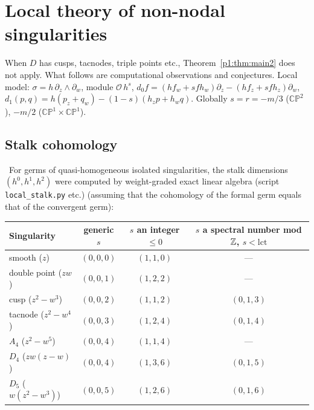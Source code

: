 \section{Local theory of non-nodal singularities}\label{p1:sec:local}
When $D$ has cusps, tacnodes, triple points etc., Theorem~\ref{p1:thm:main2} does not apply. What follows are computational observations and conjectures. Local model: $\sigma=h\,\partial_z\wedge\partial_w$, module $\mathcal O\,h^s$, $d_0f=(hf_w+sfh_w)\partial_z-(hf_z+sfh_z)\partial_w$, $d_1(p,q)=h(p_z+q_w)-(1-s)(h_zp+h_wq)$. Globally $s=r=-m/3$ ($\mathbb{CP}^2$), $-m/2$ ($\mathbb{CP}^1\times\mathbb{CP}^1$).

\subsection{Stalk cohomology}
\tV\ For germs of quasi-homogeneous isolated singularities, the stalk dimensions $(h^0,h^1,h^2)$ were computed by weight-graded exact linear algebra (script \texttt{local\_stalk.py} etc.) (assuming that the cohomology of the formal germ equals that of the convergent germ):
\begin{center}\small
\begin{tabular}{lccc}\toprule
Singularity & generic $s$ & $s$ an integer $\le0$ & $s$ a spectral number mod $\mathbb Z$, $s<\mathrm{lct}$\\\midrule
smooth ($z$) & $(0,0,0)$ & $(1,1,0)$ & ---\\
double point ($zw$) & $(0,0,1)$ & $(1,2,2)$ & ---\\
cusp ($z^2-w^3$) & $(0,0,2)$ & $(1,1,2)$ & $(0,1,3)$\\
tacnode ($z^2-w^4$) & $(0,0,3)$ & $(1,2,4)$ & $(0,1,4)$\\
$A_4$ ($z^2-w^5$) & $(0,0,4)$ & $(1,1,4)$ & ---\\
$D_4$ ($zw(z-w)$) & $(0,0,4)$ & $(1,3,6)$ & $(0,1,5)$\\
$D_5$ ($w(z^2-w^3)$) & $(0,0,5)$ & $(1,2,6)$ & $(0,1,6)$\\\bottomrule
\end{tabular}
\end{center}
